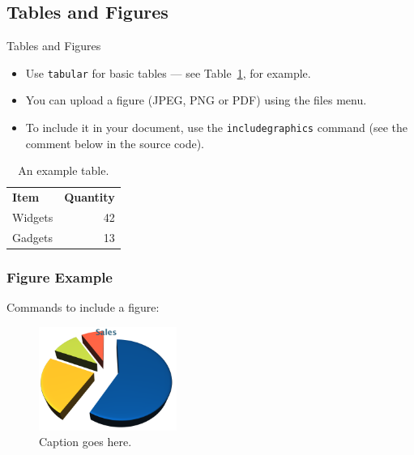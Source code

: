 \documentclass[
  10pt,
  aspectratio=169,
  xcolor={dvipsnames,table,x11names},  %
]{beamer}
\newcommand{\tableheadrow}{\rowcolor{block title.fg}}
\newcommand{\tableheadcol}[1]{{\bfseries\color{white}#1}}
\begin{document}
\subsection{Tables and Figures}

\begin{frame}{Tables and Figures}

\begin{itemize}
\item Use \texttt{tabular} for basic tables --- see Table~\ref{tab:widgets}, for example.
\item You can upload a figure (JPEG, PNG or PDF) using the files menu. 
\item To include it in your document, use the \texttt{includegraphics} command (see the comment below in the source code).
\end{itemize}

\begin{table}
\centering
\begin{tabular}{l r}
\tableheadrow
\tableheadcol{Item} & \tableheadcol{Quantity} \\
\rowcolor{gray!42}
Widgets & 42 \\
\rowcolor{gray!24}
Gadgets & 13
\end{tabular}
\caption{\label{tab:widgets}An example table.}
\end{table}

\end{frame}

\begin{frame}
\frametitle{Figure Example}

Commands to include a figure:

\begin{figure}
\includegraphics[width=0.4\textwidth]{chart}
\caption{\label{fig:your-figure}Caption goes here.}
\end{figure}
\end{frame}
\end{document}
